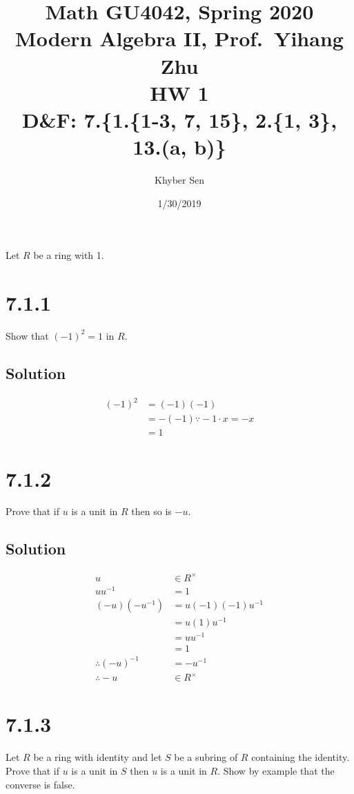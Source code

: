 \documentclass[fleqn]{article}
\title{
Math GU4042, Spring 2020 \\
Modern Algebra II, Prof.\ Yihang Zhu \\
HW 1 \\
D\&F: 7.\{1.\{1-3, 7, 15\}, 2.\{1, 3\}, 13.(a, b)\}
}
\author{Khyber Sen}
\date{1/30/2019}
\begin{document}
    
    \maketitle
    
    Let $R$ be a ring with 1.
    
    \section{7.1.1}
    Show that $(-1)^2 = 1$ in $R$.
        
        \subsection{Solution}
        \begin{align}
            (-1)^2 &= (-1)(-1) \\
                &= -(-1) \because{} -1 \cdot x = -x \\
                &= 1
        \end{align}
    
    \section{7.1.2}
    Prove that if $u$ is a unit in $R$ then so is $-u$.
        
        \subsection{Solution}
        \begin{align}
            u &\in R^\times \\
            u u^{-1} &= 1 \\
            (-u)(-u^{-1}) &= u (-1)(-1) u^{-1} \\
                &= u (1) u^{-1} \\
                &= u u^{-1} \\
                &= 1 \\
            \therefore{} (-u)^{-1} &= -u^{-1} \\
            \therefore{} -u &\in R^\times
        \end{align}
    
    \section{7.1.3}
    Let $R$ be a ring with identity and let $S$ be a subring of $R$ containing the identity.  Prove that if $u$ is a unit in $S$ then $u$ is a unit in $R$.  Show by example that the converse is false.
        
\end{document}
